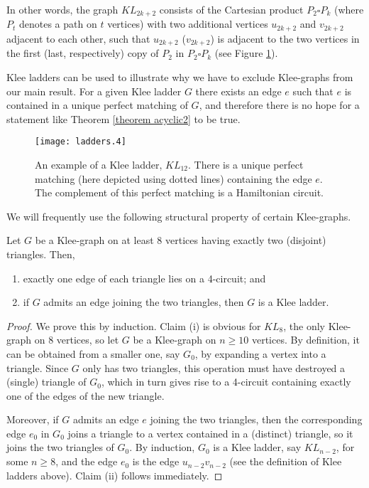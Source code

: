 \documentclass[]{theclass}
\begin{document}
In other words, the graph $KL_{2k+2}$ consists of the Cartesian product $P_2 \square P_k$ (where $P_t$ denotes a path on $t$ vertices) with two additional vertices $u_{2k+2}$ and $v_{2k+2}$ adjacent to each other, such that $u_{2k+2}$ ($v_{2k+2}$) is adjacent to the two vertices in the first (last, respectively) copy of $P_2$ in $P_2 \square P_k$ (see Figure \ref{fig:kleeLadder}).

Klee ladders can be used to illustrate why we have to exclude Klee-graphs from our main result. For a given Klee ladder $G$ there exists an edge $e$ such that $e$ is contained in a unique perfect matching of $G$, and therefore there is no hope for a statement like Theorem \ref{theorem acyclic2} to be true.

\begin{figure}[ht]
      \centering
      \texttt{[image: ladders.4]}
      \caption{An example of a Klee ladder, $KL_{12}$. {There is a unique perfect matching (here depicted using dotted lines) containing the edge $e$.} The complement of this perfect matching is a Hamiltonian circuit.}
      \label{fig:kleeLadder}
\end{figure}



We will frequently use the following structural property of certain Klee-graphs.

\begin{lemma}\label{lemma 4 circuit klee}
Let $G$ be a Klee-graph on at least 8 vertices having exactly two (disjoint) triangles. Then, 
\begin{enumerate}[label=(\roman*)]
    \item exactly one edge of each triangle lies on a 4-circuit; and 
    \item if $G$ admits an edge joining the two triangles, then $G$ is a Klee ladder.
\end{enumerate}
\end{lemma}

\begin{proof}
We prove this by induction. Claim (i) is obvious for $KL_8$, the only Klee-graph on 8 vertices, so let $G$ be a Klee-graph on $n\ge 10$ vertices. By definition, it can be obtained from a smaller one, say $G_0$, by expanding a vertex into a triangle. Since $G$ only has two triangles, this operation must have destroyed a (single) triangle of $G_0$, which in turn gives rise to a 4-circuit containing exactly one of the edges of the new triangle. 

Moreover, if $G$ admits an edge $e$ joining the two triangles, then the corresponding edge $e_0$ in $G_0$ joins a triangle to a vertex contained in a (distinct) triangle, so it joins the two triangles of $G_0$. By induction, $G_0$ is a Klee ladder, say $KL_{n-2}$, for some $n\geq 8$, and the edge $e_0$ is the edge $u_{n-2}v_{n-2}$ (see the definition of Klee ladders above). Claim (ii) follows immediately.
\end{proof}
\end{document}
